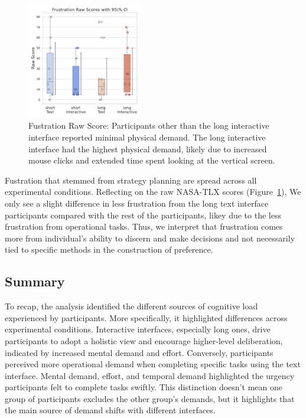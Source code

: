 \begin{figure} %
    \centering
    \includegraphics[width=0.45\textwidth, trim=0 13 0 13, clip]{content/image/cog/Frustration_scores.pdf}
    \captionsetup{width=0.40\textwidth, justification=justified} %
    \caption{Fustration Raw Score: Participants other than the long interactive interface reported minimal physical demand. The long interactive interface had the highest physical demand, likely due to increased mouse clicks and extended time spent looking at the vertical screen.}
    \label{fig:fustration_cog_score}
\end{figure}

Fustration that stemmed from strategy planning are spread across all experimental conditions. Reflecting on the raw NASA-TLX scores (Figure~\ref{fig:fustration_cog_score}), We only see a slight difference in less frustration from the long text interface participants compared with the rest of the participants, likey due to the less frustration from operational tasks. Thus, we interpret that frustration comes more from individual's ability to discern and make decisions and not necessarily tied to specific methods in the construction of preference.

\subsection{Summary}
To recap, the analysis identified the different sources of cognitive load experienced by participants. More specifically, it highlighted differences across experimental conditions. Interactive interfaces, especially long ones, drive participants to adopt a holistic view and encourage higher-level deliberation, indicated by increased mental demand and effort. Conversely, participants perceived more operational demand when completing specific tasks using the text interface. Mental demand, effort, and temporal demand highlighted the urgency participants felt to complete tasks swiftly. This distinction doesn't mean one group of participants excludes the other group's demands, but it highlights that the main source of demand shifts with different interfaces.




